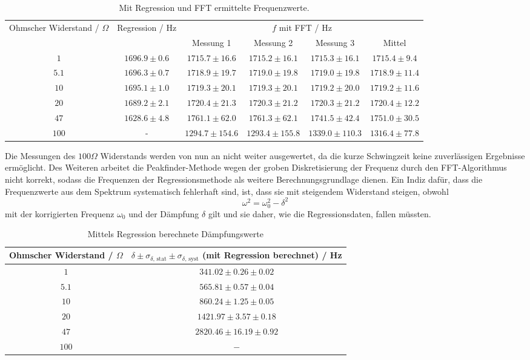 \documentclass[a4paper, 12pt]{scrartcl}
\begin{document}
\begin{table}[H]
\centering
\begin{adjustbox}{width=\textwidth}
\begin{tabular}{c|c|cccc}
\multirow{2}{*}{Ohmscher Widerstand / $\Omega$} & \multirow{2}{*}{Regression / Hz} & \multicolumn{4}{c}{$f$ mit FFT / Hz} \\
\cline{3-6}
& & Messung 1 & Messung 2 & Messung 3 & Mittel\\
\hline
$1$ & $1696.9 \pm 0.6$ & $1715.7\pm 16.6$ & $1715.2\pm 16.1$ & $1715.3\pm 16.1$ & $1715.4\pm 9.4$\\
$5.1$ & $1696.3 \pm 0.7$ & $1718.9\pm 19.7$ & $1719.0\pm 19.8$ & $1719.0\pm 19.8$ & $1718.9\pm 11.4$\\
$10$ & $1695.1 \pm 1.0$ & $1719.3\pm 20.1$ & $1719.3\pm 20.1$ & $1719.2\pm 20.0$ & $1719.2\pm 11.6$ \\
$20$ & $1689.2 \pm 2.1$ & $1720.4\pm 21.3$ & $1720.3\pm 21.2$ & $1720.3\pm 21.2$ & $1720.4\pm 12.2$\\
$47$ & $1628.6 \pm 4.8$ & $1761.1\pm 62.0$ & $1761.3\pm 62.1$ & $1741.5\pm 42.4$ & $1751.0 \pm 30.5$\\
$100$ & - & $1294.7\pm 154.6$ & $1293.4\pm 155.8$ & $1339.0\pm 110.3$ & $1316.4 \pm 77.8$
\end{tabular}
\end{adjustbox}
\caption{Mit Regression und FFT ermittelte Frequenzwerte.}
\label{tab:freq}
\end{table}

Die Messungen des $100\Omega$ Widerstands werden von nun an nicht weiter ausgewertet, da die kurze Schwingzeit keine zuverlässigen Ergebnisse ermöglicht. Des Weiteren arbeitet die Peakfinder-Methode wegen der groben Diskretisierung der Frequenz durch den FFT-Algorithmus nicht korrekt, sodass die Frequenzen der Regressionsmethode als weitere Berechnungsgrundlage dienen. Ein Indiz dafür, dass die Frequenzwerte aus dem Spektrum systematisch fehlerhaft sind, ist, dass sie mit steigendem Widerstand steigen, obwohl
\begin{equation}\label{eq:korrektur}
\omega^2 = \omega_0^2 - \delta^2
\end{equation}
mit der korrigierten Frequenz $\omega_0$ und der Dämpfung $\delta$ gilt und sie daher, wie die Regressionsdaten, fallen müssten.

\begin{table}[h]
\centering
\begin{tabular}{c|c}
Ohmscher Widerstand / $\Omega$ & $\delta \pm \sigma_{\delta\text{, stat}} \pm \sigma_{\delta\text{, syst}}$ (mit Regression berechnet) / Hz \\
\hline
$1$ & $341.02 \pm 0.26 \pm 0.02$ \\
$5.1$ & $565.81 \pm 0.57 \pm 0.04$\\
$10$ & $860.24 \pm 1.25 \pm 0.05$ \\
$20$ & $1421.97 \pm 3.57 \pm 0.18$ \\
$47$ & $2820.46 \pm 16.19 \pm 0.92$\\
$100$ & $-$
\end{tabular}
\caption{Mittels Regression berechnete Dämpfungswerte}
\label{tab:daempfung1}
\end{table}
\end{document}
